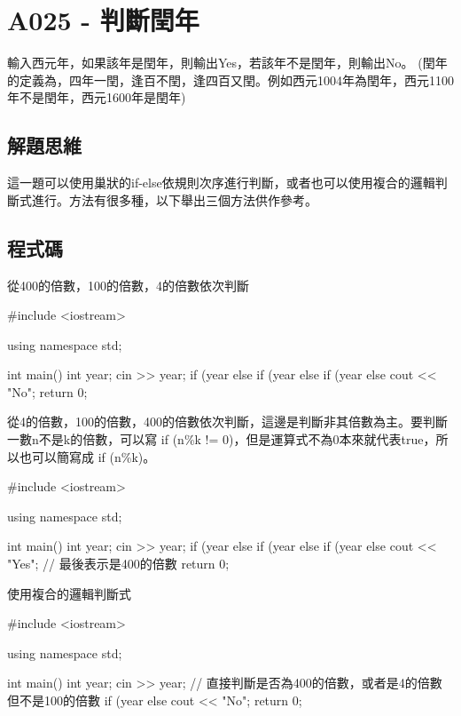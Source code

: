 \section{A025 - 判斷閏年}
輸入西元年，如果該年是閏年，則輸出Yes，若該年不是閏年，則輸出No。 (閏年的定義為，四年一閏，逢百不閏，逢四百又閏。例如西元1004年為閏年，西元1100年不是閏年，西元1600年是閏年)

\subsection{解題思維}
這一題可以使用巢狀的if-else依規則次序進行判斷，或者也可以使用複合的邏輯判斷式進行。方法有很多種，以下舉出三個方法供作參考。
\subsection{程式碼}
從400的倍數，100的倍數，4的倍數依次判斷
\begin{cppcode}
	#include <iostream>
	
	using namespace std;
	
	int main()
	{
		int year;
		cin >> year;
		if (year%
		else if (year%
		else if (year%
		else cout << "No";
		return 0;
	}
\end{cppcode}

\noindent 
從4的倍數，100的倍數，400的倍數依次判斷，這邊是判斷非其倍數為主。要判斷一數n不是k的倍數，可以寫 if (n\%k != 0)，但是運算式不為0本來就代表true，所以也可以簡寫成 if (n\%k)。
\begin{cppcode}
	#include <iostream>
	
	using namespace std;
	
	int main()
	{
		int year;
		cin >> year;
		if (year%
		else if (year%
		else if (year%
		else cout << "Yes"; // 最後表示是400的倍數
		return 0;
	}
\end{cppcode}

\noindent 使用複合的邏輯判斷式
\begin{cppcode}
	#include <iostream>
	
	using namespace std;
	
	int main()
	{
		int year;
		cin >> year;
		// 直接判斷是否為400的倍數，或者是4的倍數但不是100的倍數
		if (year%
		else cout << "No";
		return 0;
	}
\end{cppcode}

